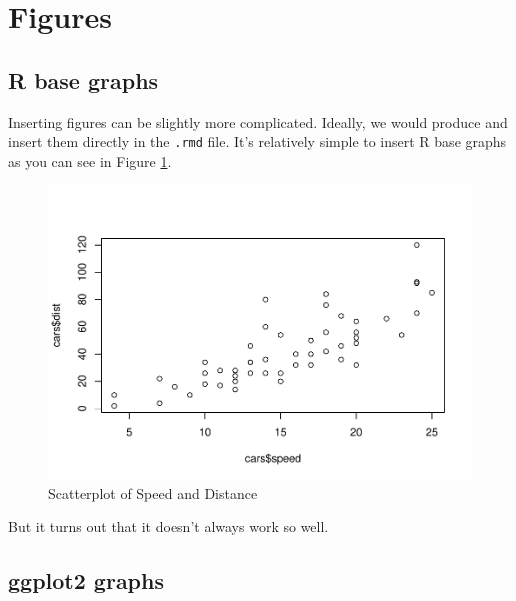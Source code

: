 \documentclass[
  12pt,
]{article}
\newenvironment{Shaded}{\begin{snugshade}}{\end{snugshade}}
\newcommand{\FunctionTok}[1]{\textcolor[rgb]{0.00,0.00,0.00}{#1}}
\newcommand{\NormalTok}[1]{#1}
\newcommand{\SpecialCharTok}[1]{\textcolor[rgb]{0.00,0.00,0.00}{#1}}
\begin{document}
\hypertarget{figures}{%
\section{Figures}\label{figures}}

\hypertarget{r-base-graphs}{%
\subsection{R base graphs}\label{r-base-graphs}}

Inserting figures can be slightly more complicated. Ideally, we would produce and insert them directly in the \texttt{.rmd} file. It's relatively simple to insert R base graphs as you can see in Figure \ref{fig:fig-1}.

\begin{Shaded}
\end{Shaded}

\begin{figure}[H]

{\centering \includegraphics{paper_files/figure-latex/fig-1-1} 

}

\caption{Scatterplot of Speed and Distance}\label{fig:fig-1}
\end{figure}

But it turns out that it doesn't always work so well.

\hypertarget{ggplot2-graphs}{%
\subsection{ggplot2 graphs}\label{ggplot2-graphs}}
\end{document}
